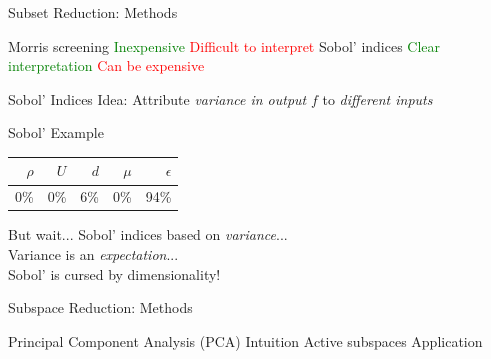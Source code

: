 \documentclass[14pt]{beamer}
\begin{document}
\begin{frame}{Subset Reduction: Methods}
  \begin{outline}
    \1 Morris screening
      \2 \textcolor{green}{Inexpensive}
      \2 \textcolor{red}{Difficult to interpret}
    \1 Sobol' indices
      \2 \textcolor{green}{Clear interpretation}
      \2 \textcolor{red}{Can be expensive}
  \end{outline}
\end{frame}

\begin{frame}{Sobol' Indices}
  Idea: Attribute \emph{variance in output} $f$ to \emph{different inputs}
\end{frame}

\begin{frame}{Sobol' Example}
  \begin{table}
    \centering
    \begin{tabular}{r|r|r|r|r}
    \hline
    $\rho$ & $U$ & $d$ & $\mu$ & $\epsilon$\\
    \hline
    0\% & 0\% & 6\% & 0\% & 94\% \\
    \hline
    \end{tabular}
  \end{table}
\end{frame}

\begin{frame}{But wait...}
  Sobol' indices based on \emph{variance}... \\
  Variance is an \emph{expectation}... \\

  \bigskip Sobol' is cursed by dimensionality!
\end{frame}

\begin{frame}{Subspace Reduction: Methods}
  \begin{outline}
    \1 Principal Component Analysis (PCA)
      \2 Intuition
    \1 Active subspaces
      \2 Application
  \end{outline}
\end{frame}
\end{document}
